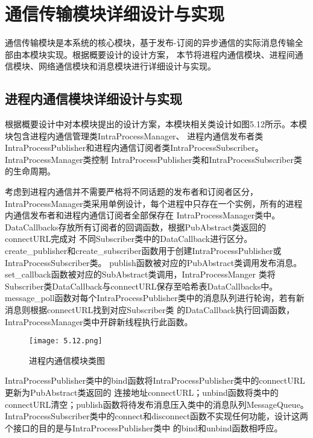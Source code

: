 \section{通信传输模块详细设计与实现}
通信传输模块是本系统的核心模块，基于发布-订阅的异步通信的实际消息传输全部由本模块实现。根据概要设计的设计方案，
本节将进程内通信模块、进程间通信模块、网络通信模块和消息模块进行详细设计与实现。
\subsection{进程内通信模块详细设计与实现}
根据概要设计中对本模块提出的设计方案，本模块相关类设计如图5.12所示。本模块包含进程内通信管理类IntraProcessManager、
进程内通信发布者类IntraProcessPublisher和进程内通信订阅者类IntraProcessSubscriber。IntraProcessManager类控制
IntraProcessPublisher类和IntraProcessSubscriber类的生命周期。

考虑到进程内通信并不需要严格将不同话题的发布者和订阅者区分，
IntraProcessManager类采用单例设计，每个进程中只存在一个实例，所有的进程内通信发布者和进程内通信订阅者全部保存在
IntraProcessManager类中。DataCallbacks存放所有订阅者的回调函数，根据PubAbstract类返回的connectURL完成对
不同Subscriber类中的DataCallback进行区分。
create\_publisher和create\_subscriber函数用于创建IntraProcessPublisher或IntraProcessSubscriber类。
publish函数被对应的PubAbstract类调用发布消息。
set\_callback函数被对应的SubAbstract类调用，IntraProcessManger
类将Subscriber类DataCallback与connectURL保存至哈希表DataCallbacks中。
message\_poll函数对每个IntraProcessPublisher类中的消息队列进行轮询，若有新消息则根据connectURL找到对应Subscriber类
的DataCallback执行回调函数，IntraProcessManager类中开辟新线程执行此函数。
\begin{figure}[H]
  \centering
  \texttt{[image: 5.12.png]}
  \caption{进程内通信模块类图}
  \label{fig:11}
\end{figure}
IntraProcessPublisher类中的bind函数将IntraProcessPublisher类中的connectURL更新为PubAbstract类返回的
连接地址connectURL；unbind函数将类中的connectURL清空；publish函数将待发布消息压入类中的消息队列MessageQueue。
IntraProcessSubscriber类中的connect和disconnect函数不实现任何功能，设计这两个接口的目的是与IntraProcessPublisher类中
的bind和unbind函数相呼应。

